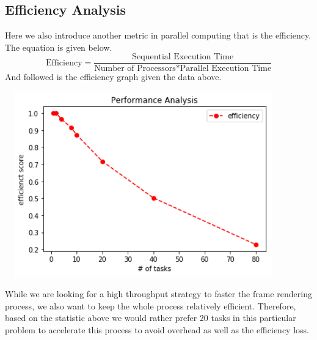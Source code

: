 \documentclass{cs4444}
\begin{document}
\subsection{Efficiency Analysis}
Here we also introduce another metric in parallel computing that is the efficiency. The equation is given below.
\[
	\text{Efficiency} = \frac{\text{Sequential Execution Time}}{\text{Number of Processors}*\text{Parallel Execution Time}}
\]
And followed is the efficiency graph given the data above.
\begin{center}
\includegraphics[width=12cm, height=8cm]{efficiency}
\end{center}
While we are looking for a high throughput strategy to faster the frame rendering process, we also want to keep the whole process relatively efficient. Therefore, based on the statistic above we would rather prefer 20 tasks in this particular problem to accelerate this process to avoid overhead as well as the efficiency loss.
\end{document}
